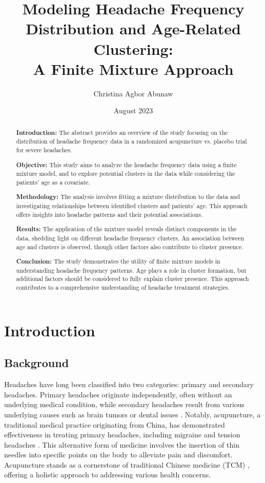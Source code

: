 \documentclass[a4paper, 12pt]{article}
\title{
    \vspace{2cm}
    \textbf{\LARGE Modeling Headache Frequency Distribution and Age-Related Clustering:} \\
    \vspace{0.5cm}
    \textbf{\LARGE A Finite Mixture Approach}
    \vspace{7cm}
}
\author{Christina Agbor Abunaw}
\date{August 2023}
\begin{document}
\maketitle
\newpage

\begin{abstract}
    \noindent\textbf{Introduction:} The abstract provides an overview of the study focusing on the distribution of headache frequency data in a randomized acupuncture vs. placebo trial for severe headaches.
    
    \noindent\textbf{Objective:} This study aims to analyze the headache frequency data using a finite mixture model, and to explore potential clusters in the data while considering the patients' age as a covariate.
    
    \noindent\textbf{Methodology:} The analysis involves fitting a mixture distribution to the data and investigating relationships between identified clusters and patients' age. This approach offers insights into headache patterns and their potential associations.
    
    \noindent\textbf{Results:} The application of the mixture model reveals distinct components in the data, shedding light on different headache frequency clusters. An association between age and clusters is observed, though other factors also contribute to cluster presence.
    
    \noindent\textbf{Conclusion:} The study demonstrates the utility of finite mixture models in understanding headache frequency patterns. Age plays a role in cluster formation, but additional factors should be considered to fully explain cluster presence. This approach contributes to a comprehensive understanding of headache treatment strategies.
\end{abstract}


\newpage

\tableofcontents
\thispagestyle{empty}
\newpage


\section{Introduction}
    \subsection{Background}
Headaches have long been classified into two categories: primary and secondary headaches. Primary headaches originate independently, often without an underlying medical condition, while secondary headaches result from various underlying causes such as brain tumors or dental issues \citep{nyacuhealth}. Notably, acupuncture, a traditional medical practice originating from China, has demonstrated effectiveness in treating primary headaches, including migraine and tension headaches \citep{nyacuhealth}. This alternative form of medicine involves the insertion of thin needles into specific points on the body to alleviate pain and discomfort. Acupuncture stands as a cornerstone of traditional Chinese medicine (TCM) \citep{vickers2004}, offering a holistic approach to addressing various health concerns.
\end{document}
